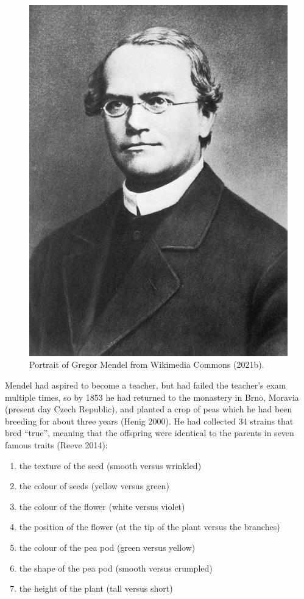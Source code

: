 \documentclass[
]{book}
\begin{document}
\begin{figure}

{\centering \includegraphics[width=0.6\linewidth]{figs/introduction/Gregor_Mendel_2} 

}

\caption{Portrait of Gregor Mendel from Wikimedia Commons (2021b).}\label{fig:mendel}
\end{figure}

Mendel had aspired to become a teacher, but had failed the teacher's exam multiple times, so by 1853 he had returned to the monastery in Brno, Moravia (present day Czech Republic), and planted a crop of peas which he had been breeding for about three years (Henig 2000). He had collected 34 strains that bred ``true'', meaning that the offspring were identical to the parents in seven famous traits (Reeve 2014):

\begin{enumerate}
\def\labelenumi{\arabic{enumi}.}
\item
  the texture of the seed (smooth versus wrinkled)
\item
  the colour of seeds (yellow versus green)
\item
  the colour of the flower (white versus violet)
\item
  the position of the flower (at the tip of the plant versus the branches)
\item
  the colour of the pea pod (green versus yellow)
\item
  the shape of the pea pod (smooth versus crumpled)
\item
  the height of the plant (tall versus short)
\end{enumerate}
\end{document}
